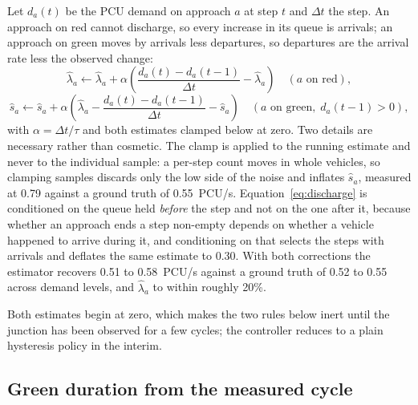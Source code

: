 \documentclass[journal]{IEEEtran}
\newcommand{\pcu}{PCU}
\begin{document}
Let $d_a(t)$ be the \pcu{} demand on approach $a$ at step $t$ and $\Delta t$ the step. An approach on
red cannot discharge, so every increase in its queue is arrivals; an approach on green moves by
arrivals less departures, so departures are the arrival rate less the observed change:
\begin{equation}
\hat{\lambda}_a \leftarrow \hat{\lambda}_a + \alpha\left(\frac{d_a(t) - d_a(t-1)}{\Delta t} -
\hat{\lambda}_a\right) \quad (a \text{ on red}),
\label{eq:arrival}
\end{equation}
\begin{equation}
\hat{s}_a \leftarrow \hat{s}_a + \alpha\left(\hat{\lambda}_a - \frac{d_a(t) - d_a(t-1)}{\Delta t} -
\hat{s}_a\right) \quad (a \text{ on green},\; d_a(t-1) > 0),
\label{eq:discharge}
\end{equation}
with $\alpha = \Delta t / \tau$ and both estimates clamped below at zero. Two details are necessary
rather than cosmetic. The clamp is applied to the running estimate and never to the individual
sample: a per-step count moves in whole vehicles, so clamping samples discards only the low side of
the noise and inflates $\hat{s}_a$, measured at 0.79 against a ground truth of 0.55~\pcu/s.
Equation~\ref{eq:discharge} is conditioned on the queue held \emph{before} the step and not on the
one after it, because whether an approach ends a step non-empty depends on whether a vehicle happened
to arrive during it, and conditioning on that selects the steps with arrivals and deflates the same
estimate to 0.30. With both corrections the estimator recovers 0.51 to 0.58~\pcu/s against a ground
truth of 0.52 to 0.55 across demand levels, and $\hat{\lambda}_a$ to within roughly 20\%.

Both estimates begin at zero, which makes the two rules below inert until the junction has been
observed for a few cycles; the controller reduces to a plain hysteresis policy in the interim.

\subsection{Green duration from the measured cycle}
\label{sec:floor}
\end{document}
